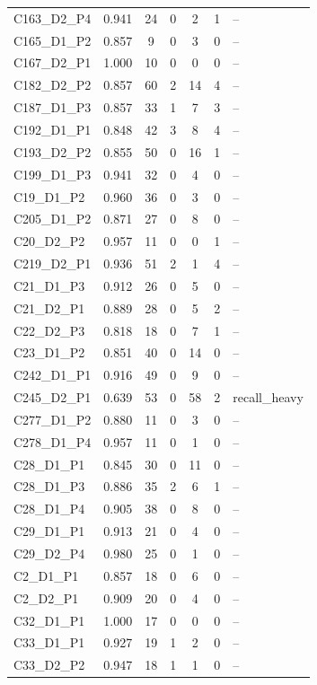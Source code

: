 {\begin{tabular}{p{2.6cm}ccccc p{4.8cm}}
 C163\_D2\_P4 & 0.941 & 24 & 0 & 2 & 1 & -- \\
 C165\_D1\_P2 & 0.857 & 9 & 0 & 3 & 0 & -- \\
 C167\_D2\_P1 & 1.000 & 10 & 0 & 0 & 0 & -- \\
 C182\_D2\_P2 & 0.857 & 60 & 2 & 14 & 4 & -- \\
 C187\_D1\_P3 & 0.857 & 33 & 1 & 7 & 3 & -- \\
 C192\_D1\_P1 & 0.848 & 42 & 3 & 8 & 4 & -- \\
 C193\_D2\_P2 & 0.855 & 50 & 0 & 16 & 1 & -- \\
 C199\_D1\_P3 & 0.941 & 32 & 0 & 4 & 0 & -- \\
 C19\_D1\_P2 & 0.960 & 36 & 0 & 3 & 0 & -- \\
 C205\_D1\_P2 & 0.871 & 27 & 0 & 8 & 0 & -- \\
 C20\_D2\_P2 & 0.957 & 11 & 0 & 0 & 1 & -- \\
 C219\_D2\_P1 & 0.936 & 51 & 2 & 1 & 4 & -- \\
 C21\_D1\_P3 & 0.912 & 26 & 0 & 5 & 0 & -- \\
 C21\_D2\_P1 & 0.889 & 28 & 0 & 5 & 2 & -- \\
 C22\_D2\_P3 & 0.818 & 18 & 0 & 7 & 1 & -- \\
 C23\_D1\_P2 & 0.851 & 40 & 0 & 14 & 0 & -- \\
 C242\_D1\_P1 & 0.916 & 49 & 0 & 9 & 0 & -- \\
 C245\_D2\_P1 & 0.639 & 53 & 0 & 58 & 2 & recall\_heavy \\
 C277\_D1\_P2 & 0.880 & 11 & 0 & 3 & 0 & -- \\
 C278\_D1\_P4 & 0.957 & 11 & 0 & 1 & 0 & -- \\
 C28\_D1\_P1 & 0.845 & 30 & 0 & 11 & 0 & -- \\
 C28\_D1\_P3 & 0.886 & 35 & 2 & 6 & 1 & -- \\
 C28\_D1\_P4 & 0.905 & 38 & 0 & 8 & 0 & -- \\
 C29\_D1\_P1 & 0.913 & 21 & 0 & 4 & 0 & -- \\
 C29\_D2\_P4 & 0.980 & 25 & 0 & 1 & 0 & -- \\
 C2\_D1\_P1 & 0.857 & 18 & 0 & 6 & 0 & -- \\
 C2\_D2\_P1 & 0.909 & 20 & 0 & 4 & 0 & -- \\
 C32\_D1\_P1 & 1.000 & 17 & 0 & 0 & 0 & -- \\
 C33\_D1\_P1 & 0.927 & 19 & 1 & 2 & 0 & -- \\
 C33\_D2\_P2 & 0.947 & 18 & 1 & 1 & 0 & -- \\

\end{tabular}}
